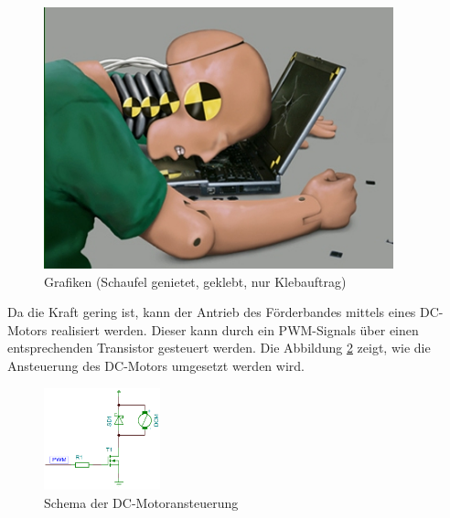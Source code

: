 \begin{figure}
	\centering
	\includegraphics[width=0.9\textwidth]{Enddokumentation/CrashTestDummy.jpg}
	\caption{Grafiken (Schaufel genietet, geklebt, nur Klebauftrag)}
	\label{fig:Grafiken (Schaufel genietet, geklebt, nur Klebauftrag)}	
\end{figure}

Da die Kraft gering ist, kann der Antrieb des Förderbandes mittels eines DC-Motors realisiert werden. Dieser kann durch ein PWM-Signals über einen entsprechenden Transistor gesteuert werden. Die Abbildung \ref{fig:Schema_DC-Motor} zeigt, wie die Ansteuerung des DC-Motors umgesetzt werden wird.
	\begin{figure}[h!] %
		\centering
		\includegraphics[width=0.3\textwidth]{Enddokumentation/Loesungskonzept/Bilder/SchemaDcMotor.png}
		\caption{Schema der DC-Motoransteuerung}
		\label{fig:Schema_DC-Motor}
	\end{figure}